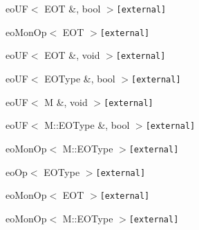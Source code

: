 \begin{CompactList}
\begin{CompactList}
\begin{CompactList}
\end{CompactList}
\item eoUF$<$ EOT \&, bool $>${\tt  [external]}\begin{CompactList}
\item eoMonOp$<$ EOT $>${\tt  [external]}\begin{CompactList}
\item {}
\end{CompactList}
\end{CompactList}
\item eoUF$<$ EOT \&, void $>${\tt  [external]}\begin{CompactList}
\item {}
\end{CompactList}
\item eoUF$<$ EOType \&, bool $>${\tt  [external]}\item eoUF$<$ M \&, void $>${\tt  [external]}\begin{CompactList}
\item {}
\end{CompactList}
\item eoUF$<$ M::EOType \&, bool $>${\tt  [external]}\begin{CompactList}
\item eoMonOp$<$ M::EOType $>${\tt  [external]}\begin{CompactList}
\item {}
\begin{CompactList}
\item {}
\item {}
\item {}
\item {}
\end{CompactList}
\end{CompactList}
\end{CompactList}
\end{CompactList}
\item eoOp$<$ EOType $>${\tt  [external]}\begin{CompactList}
\item eoMonOp$<$ EOT $>${\tt  [external]}\item eoMonOp$<$ M::EOType $>${\tt  [external]}\end{CompactList}
\end{CompactList}
